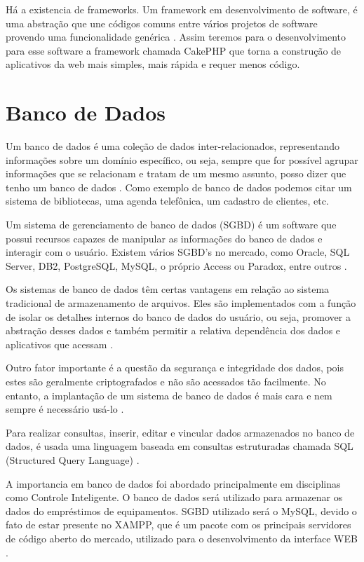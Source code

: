 Há a existencia de frameworks. Um framework em desenvolvimento de software, é uma abstração que une códigos comuns entre vários projetos de software provendo uma funcionalidade genérica \cite{WEB3}. Assim teremos para o desenvolvimento para esse software a framework chamada CakePHP \cite{Cake} que  torna a construção de aplicativos da web mais simples, mais rápida e requer menos código. 

\section[Banco de Dados]{Banco de Dados}
Um banco de dados é uma coleção de dados inter-relacionados, representando informações sobre um domínio específico, ou seja, sempre que for possível agrupar informações que se relacionam e tratam de um mesmo assunto, posso dizer que tenho um banco de dados \cite{BD1}. Como exemplo de banco de dados podemos citar um sistema de bibliotecas, uma agenda telefônica, um cadastro de clientes, etc.

Um sistema de gerenciamento de banco de dados (SGBD) é um software que possui recursos capazes de manipular as informações do banco de dados e interagir com o usuário. Existem vários SGBD’s no mercado, como Oracle, SQL Server, DB2, PostgreSQL, MySQL, o próprio Access ou Paradox, entre outros \cite{BD1}.

Os sistemas de banco de dados têm certas vantagens em relação ao sistema tradicional de armazenamento de arquivos. Eles são implementados com a função de isolar os detalhes internos do banco de dados do usuário, ou seja, promover a abstração desses dados e também permitir a relativa dependência dos dados e aplicativos que acessam \cite{BD1}.

Outro fator importante é a questão da segurança e integridade dos dados, pois estes são geralmente criptografados e não são acessados tão facilmente. No entanto, a implantação de um sistema de banco de dados é mais cara e nem sempre é necessário usá-lo \cite{BD1}.

Para realizar consultas, inserir, editar e vincular dados armazenados no banco de dados, é usada uma linguagem baseada em consultas estruturadas chamada SQL (Structured Query Language) \cite{BD1}.

A importancia em banco de dados foi abordado principalmente em disciplinas como Controle Inteligente. O banco de dados será  utilizado para armazenar os dados do empréstimos de equipamentos. SGBD utilizado será o MySQL, devido o fato de estar presente no XAMPP, que é um pacote com os principais servidores de código aberto do mercado, utilizado para o desenvolvimento da interface WEB \cite{BD2}.

